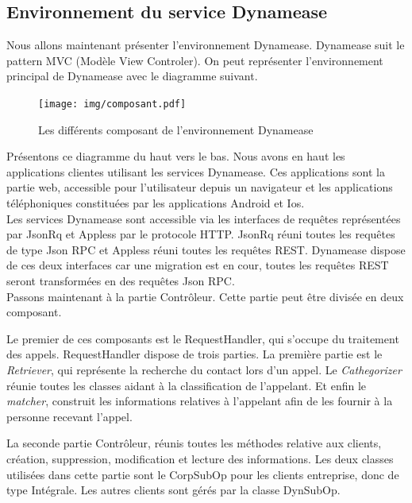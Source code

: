 \subsection{Environnement du service Dynamease}

Nous allons maintenant présenter l'environnement Dynamease. Dynamease suit le pattern MVC (Modèle View Controler). On peut représenter l'environnement principal de Dynamease avec le diagramme suivant.

\newpage

\begin{figure}[!h]
	\centering
	\texttt{[image: img/composant.pdf]}
	\caption{\label{composant} Les différents composant de l'environnement Dynamease}
\end{figure}

Présentons ce diagramme du haut vers le bas. Nous avons en haut les applications clientes utilisant les services Dynamease. Ces applications sont la partie web, accessible pour l'utilisateur depuis un navigateur et les applications téléphoniques constituées par les applications Android et Ios.\\

Les services Dynamease sont accessible via les interfaces de requêtes représentées par JsonRq et Appless par le protocole HTTP. JsonRq réuni toutes les requêtes de type Json RPC et Appless réuni toutes les requêtes REST. Dynamease dispose de ces deux interfaces car une migration est en cour, toutes les requêtes REST seront transformées en des requêtes Json RPC.\\

Passons maintenant à la partie Contrôleur. Cette partie peut être divisée en deux composant.

Le premier de ces composants est le RequestHandler, qui s'occupe du traitement des appels. RequestHandler dispose de trois parties. La première partie est le \textit{Retriever}, qui représente la recherche du contact lors d'un appel. Le \textit{Cathegorizer} réunie toutes les classes aidant à la classification de l'appelant. Et enfin le \textit{matcher}, construit les informations relatives à l'appelant afin de les fournir à la personne recevant l'appel.

La seconde partie Contrôleur, réunis toutes les méthodes relative aux clients, création, suppression, modification et lecture des informations. Les deux classes utilisées dans cette partie sont le CorpSubOp pour les clients entreprise, donc de type Intégrale. Les autres clients sont gérés par la classe DynSubOp.\\

